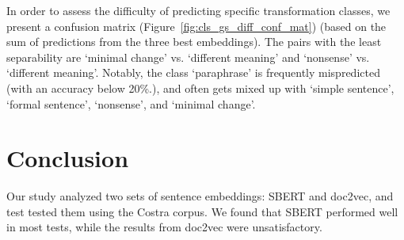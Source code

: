 \documentclass[11pt]{article}
\begin{document}
In order to assess the difficulty of predicting specific transformation classes, we present a confusion matrix (Figure~\ref{fig:cls_gs_diff_conf_mat}) (based on the sum of predictions from the three best embeddings). The pairs with the least separability are `minimal change' vs. `different meaning' and `nonsense' vs. `different meaning'. Notably, the class `paraphrase' is frequently mispredicted (with an accuracy below 20\%.), and often gets mixed up with `simple sentence', `formal sentence', `nonsense', and `minimal change'.




\section{Conclusion}

Our study analyzed two sets of sentence embeddings: SBERT and doc2vec, and test tested them using the Costra corpus. We found that SBERT performed well in most tests, while the results from doc2vec were unsatisfactory.
\end{document}

